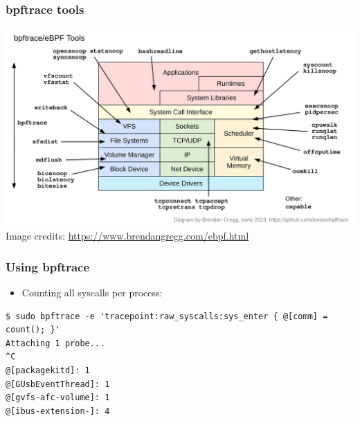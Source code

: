 \begin{frame}[fragile]
  \frametitle{bpftrace tools}
  \center\includegraphics[height=0.8\textheight]{slides/debugging-system-wide-profiling/bpftrace_tools_early2019.png}\\ 
  \tiny Image credits: \url{https://www.brendangregg.com/ebpf.html}
\end{frame}

\begin{frame}[fragile]
  \frametitle{Using bpftrace}
  \begin{itemize}
    \item Counting all syscalls per process:
  \end{itemize}
  \begin{block}{}
    \begin{verbatim}
$ sudo bpftrace -e 'tracepoint:raw_syscalls:sys_enter { @[comm] = count(); }'
Attaching 1 probe...
^C
@[packagekitd]: 1
@[GUsbEventThread]: 1
@[gvfs-afc-volume]: 1
@[ibus-extension-]: 4
    \end{verbatim}
  \end{block}
\end{frame}

